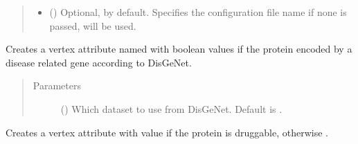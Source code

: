 \documentclass[letterpaper,10pt,english]{sphinxmanual}
\begin{document}
\begin{fulllineitems}
\begin{fulllineitems}
\begin{quote}
\begin{description}
\begin{itemize}
\item {} 
 () \textendash{} Optional,  by default. Specifies the configuration
file name if none is passed, 
will be used.

\end{itemize}

\end{description}\end{quote}

\end{fulllineitems}


\begin{fulllineitems}
\label{\detokenize{main:pypath.main.PyPath.set_disease_genes}}
Creates a vertex attribute named  with boolean values 
if the protein encoded by a disease related gene according to
DisGeNet.
\begin{quote}\begin{description}
\item[{Parameters}] \leavevmode
{} () \textendash{} Which dataset to use from DisGeNet. Default is .

\end{description}\end{quote}

\end{fulllineitems}


\begin{fulllineitems}
\label{\detokenize{main:pypath.main.PyPath.set_druggability}}
Creates a vertex attribute  with value  if
the protein is druggable, otherwise .

\end{fulllineitems}



\end{fulllineitems}
\end{document}
